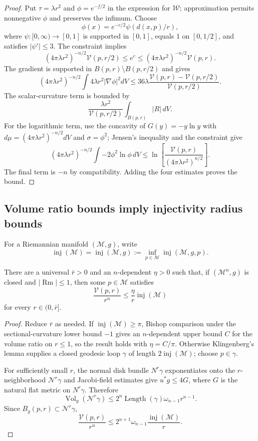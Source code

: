 \begin{proof}
\sketch Put $\tau=\lambda r^2$ and $\phi=e^{-f/2}$ in the expression for
$\mathcal W$; approximation permits nonnegative $\phi$ and preserves the
infimum. Choose
\[
\phi(x)=e^{-c/2}\psi(d(x,p)/r),
\]
where $\psi:[0,\infty)\to[0,1]$ is supported in $[0,1]$, equals $1$ on
$[0,1/2]$, and satisfies $|\psi'|\leq3$. The constraint implies
\[
(4\pi\lambda r^2)^{-n/2}\mathcal V(p,r/2)
\leq e^c\leq
(4\pi\lambda r^2)^{-n/2}\mathcal V(p,r).
\]
The gradient is supported in $B(p,r)\setminus B(p,r/2)$ and gives
\[
(4\pi\lambda r^2)^{-n/2}\int4\lambda r^2|\nabla\phi|^2dV
\leq36\lambda\frac{\mathcal V(p,r)-\mathcal V(p,r/2)}{\mathcal V(p,r/2)}.
\]
The scalar-curvature term is bounded by
\[
\frac{\lambda r^2}{\mathcal V(p,r/2)}\int_{B(p,r)}|R|\,dV.
\]
For the logarithmic term, use the concavity of $G(y)=-y\ln y$ with
$d\mu=(4\pi\lambda r^2)^{-n/2}dV$ and $\sigma=\phi^2$; Jensen's inequality
and the constraint give
\[
(4\pi\lambda r^2)^{-n/2}\int-2\phi^2\ln\phi\,dV
\leq\ln\left[\frac{\mathcal V(p,r)}{(4\pi\lambda r^2)^{n/2}}\right].
\]
The final term is $-n$ by compatibility. Adding the four estimates proves
the bound.
\end{proof}

\subsection{Volume ratio bounds imply injectivity radius bounds}

For a Riemannian manifold $(\mathcal M,g)$, write
\[
\operatorname{inj}(\mathcal M)=\operatorname{inj}(\mathcal M,g)
:=\inf_{p\in\mathcal M}\operatorname{inj}(\mathcal M,g,p).
\]

\begin{lemma}
\label{topping-ch8-volume-ratio-inj-estimate}
There are a universal $\bar r>0$ and an $n$-dependent $\eta>0$ such that,
if $(\mathcal M^n,g)$ is closed and $|\operatorname{Rm}|\leq1$, then some
$p\in\mathcal M$ satisfies
\[
\frac{\mathcal V(p,r)}{r^n}\leq\frac\eta r\operatorname{inj}(\mathcal M)
\]
for every $r\in(0,\bar r]$.
\end{lemma}

\begin{proof}
\sketch Reduce $\bar r$ as needed. If $\operatorname{inj}(\mathcal M)\geq\pi$,
Bishop comparison under the sectional-curvature lower bound $-1$ gives an
$n$-dependent upper bound $C$ for the volume ratio on $r\leq1$, so the result
holds with $\eta=C/\pi$. Otherwise Klingenberg's lemma supplies a closed
geodesic loop $\gamma$ of length $2\operatorname{inj}(\mathcal M)$; choose
$p\in\gamma$.

For sufficiently small $r$, the normal disk bundle $N^r\gamma$ exponentiates
onto the $r$-neighborhood $\mathcal N^r\gamma$ and Jacobi-field estimates give
$u^*g\leq4G$, where $G$ is the natural flat metric on $N^r\gamma$. Therefore
\[
\operatorname{Vol}_g(\mathcal N^r\gamma)
\leq2^n\operatorname{Length}(\gamma)\omega_{n-1}r^{n-1}.
\]
Since $B_g(p,r)\subset\mathcal N^r\gamma$,
\[
\frac{\mathcal V(p,r)}{r^n}
\leq2^{n+1}\omega_{n-1}\frac{\operatorname{inj}(\mathcal M)}r.
\]
\end{proof}

